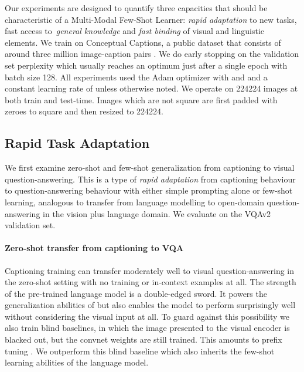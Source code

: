 Our experiments are designed to quantify three capacities that should be characteristic of a Multi-Modal Few-Shot Learner: \emph{rapid adaptation} to new tasks, fast access to~\emph{general knowledge} and \emph{fast binding} of visual and linguistic elements. We train \Model on Conceptual Captions, a public dataset that consists of around three million image-caption pairs \cite{sharma2018conceptual}. We do early stopping on the validation set perplexity which usually reaches an optimum just after a single epoch with batch size 128. All experiments used the Adam optimizer with  and  and a constant learning rate of  unless otherwise noted. We operate on 224224 images at both train and test-time. Images which are not square are first padded with zeroes to square and then resized to 224224.

\subsection{Rapid Task Adaptation}
\label{sec:rapid_adaptation}

We first examine zero-shot and few-shot generalization from captioning to visual question-answering. This is a type of \emph{rapid adaptation} from captioning behaviour to question-answering behaviour with either simple prompting alone or few-shot learning, analogous to transfer from language modelling to open-domain question-answering \cite{roberts2020much} in the vision plus language domain. We evaluate on the VQAv2 \cite{goyal2017making} validation set.

\paragraph{Zero-shot transfer from captioning to VQA}

Captioning training can transfer moderately well to visual question-answering in the zero-shot setting with no training or in-context examples at all. The strength of the pre-trained language model is a double-edged sword. It powers the generalization abilities of \Model but also enables the model to perform surprisingly well without considering the visual input at all. To guard against this possibility we also train blind baselines, in which the image presented to the visual encoder is blacked out, but the convnet weights are still trained. This amounts to prefix tuning \cite{li2021prefix}. We outperform this blind baseline which also inherits the few-shot learning abilities of the language model.

